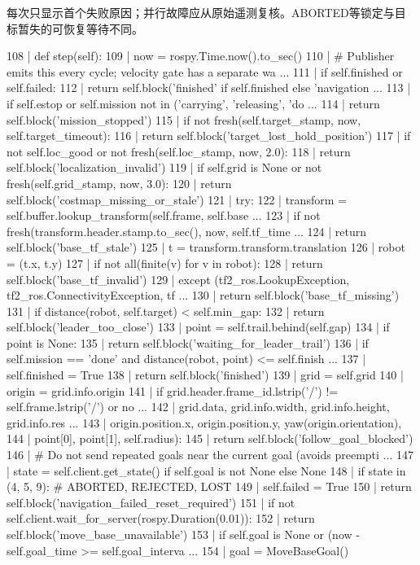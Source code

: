 每次只显示首个失败原因；并行故障应从原始遥测复核。ABORTED等锁定与目标暂失的可恢复等待不同。
\begin{CodeBlock}
 108 |     def step(self):
 109 |         now = rospy.Time.now().to_sec()
 110 |         # Publisher emits this every cycle; velocity gate has a separate wa ...
 111 |         if self.finished or self.failed:
 112 |             return self.block('finished' if self.finished else 'navigation  ...
 113 |         if self.estop or self.mission not in ('carrying', 'releasing', 'do  ...
 114 |             return self.block('mission_stopped')
 115 |         if not fresh(self.target_stamp, now, self.target_timeout):
 116 |             return self.block('target_lost_hold_position')
 117 |         if not self.loc_good or not fresh(self.loc_stamp, now, 2.0):
 118 |             return self.block('localization_invalid')
 119 |         if self.grid is None or not fresh(self.grid_stamp, now, 3.0):
 120 |             return self.block('costmap_missing_or_stale')
 121 |         try:
 122 |             transform = self.buffer.lookup_transform(self.frame, self.base  ...
 123 |             if not fresh(transform.header.stamp.to_sec(), now, self.tf_time ...
 124 |                 return self.block('base_tf_stale')
 125 |             t = transform.transform.translation
 126 |             robot = (t.x, t.y)
 127 |             if not all(finite(v) for v in robot):
 128 |                 return self.block('base_tf_invalid')
 129 |         except (tf2_ros.LookupException, tf2_ros.ConnectivityException, tf  ...
 130 |             return self.block('base_tf_missing')
 131 |         if distance(robot, self.target) < self.min_gap:
 132 |             return self.block('leader_too_close')
 133 |         point = self.trail.behind(self.gap)
 134 |         if point is None:
 135 |             return self.block('waiting_for_leader_trail')
 136 |         if self.mission == 'done' and distance(robot, point) <= self.finish ...
 137 |             self.finished = True
 138 |             return self.block('finished')
 139 |         grid = self.grid
 140 |         origin = grid.info.origin
 141 |         if grid.header.frame_id.lstrip('/') != self.frame.lstrip('/') or no ...
 142 |                 grid.data, grid.info.width, grid.info.height, grid.info.res ...
 143 |                 origin.position.x, origin.position.y, yaw(origin.orientation),
 144 |                 point[0], point[1], self.radius):
 145 |             return self.block('follow_goal_blocked')
 146 |         # Do not send repeated goals near the current goal (avoids preempti ...
 147 |         state = self.client.get_state() if self.goal is not None else None
 148 |         if state in (4, 5, 9):  # ABORTED, REJECTED, LOST
 149 |             self.failed = True
 150 |             return self.block('navigation_failed_reset_required')
 151 |         if not self.client.wait_for_server(rospy.Duration(0.01)):
 152 |             return self.block('move_base_unavailable')
 153 |         if self.goal is None or (now - self.goal_time >= self.goal_interva  ...
 154 |             goal = MoveBaseGoal()
\end{CodeBlock}
